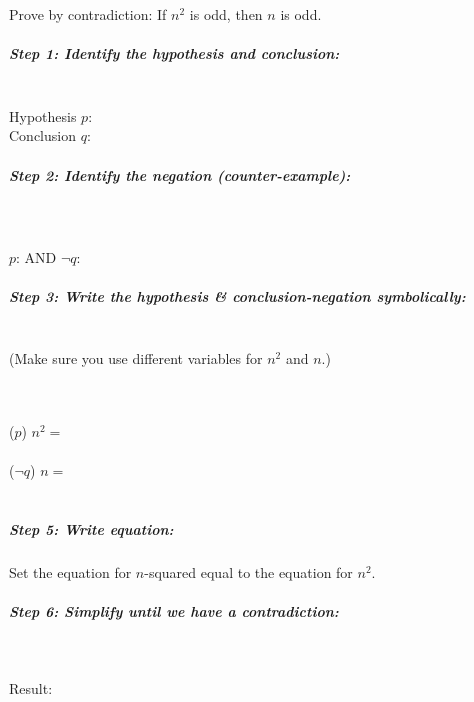 \documentclass[a4paper,12pt]{book}
\newcounter{question}
\begin{document}
        \newpage
        \begin{questionNOGRADE}{\thequestion}

            Prove by contradiction: If $n^{2}$ is odd, then $n$ is odd.

            \subparagraph{Step 1: Identify the hypothesis and conclusion:}
                ~\\ \tab Hypothesis $p$:    
                ~\\ \tab Conclusion $q$:    
            
            \subparagraph{Step 2: Identify the negation (counter-example):} ~\\~\\
            	\tab[0.5cm]
                $p$:
                 AND \tab[0.5cm]
                $\neg q$:
            
                
            \subparagraph{Step 3: Write the hypothesis \& conclusion-negation symbolically:}
            ~\\
            (Make sure you use different variables for $n^{2}$ and $n$.)
                
                ~\\~\\ \tab ($p$) \tab $n^{2} = $ 
                ~\\~\\ \tab ($\neg q$) \tab $n = $ 
                ~\\~\\ 

            \subparagraph{Step 5: Write equation:}
            
            Set the equation for $n$-squared equal to the equation for $n^2$.
            

            \subparagraph{Step 6: Simplify until we have a contradiction:} ~\\

            Result:
            
        \end{questionNOGRADE}
\end{document}
